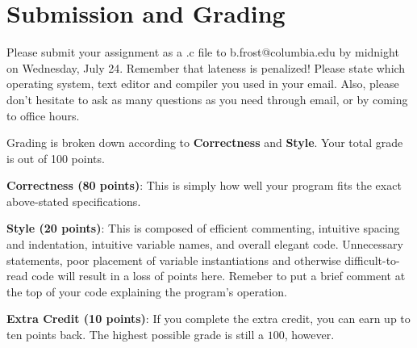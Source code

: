 \documentclass{article}
\begin{document}
\section*{Submission and Grading}
Please submit your assignment as a .c file to b.frost@columbia.edu by midnight on Wednesday, July 24. Remember that lateness is penalized! Please state which operating system, text editor and compiler you used in your email. Also, please don't hesitate to ask as many questions as you need through email, or by coming to office hours.

Grading is broken down according to \textbf{Correctness} and \textbf{Style}. Your total grade is out of 100 points.

\noindent\textbf{Correctness (80 points)}: This is simply how well your program fits the exact above-stated specifications.

\noindent\textbf{Style (20 points)}: This is composed of efficient commenting, intuitive spacing and indentation, intuitive variable names, and overall elegant code. Unnecessary statements, poor placement of variable instantiations and otherwise difficult-to-read code will result in a loss of points here. Remeber to put a brief comment at the top of your code explaining the program's operation.

\noindent\textbf{Extra Credit (10 points)}: If you complete the extra credit, you can earn up to ten points back. The highest possible grade is still a $100$, however.
\end{document}
